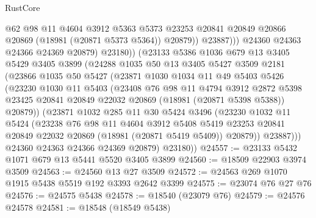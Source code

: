 \begin{lexlean}{RustCore}
\begin{coremodule}
                      @62
                      @98
                      @11
                      @4604
                      @3912
                      @5363
                      @5373
                      @23253
                      @20841
                      @20849
                      @20866
                      @20869
                      (@18981 (@20871 @5373 @5364))
                      @20879))
                  @23887)))
            @24360
            @24363
            @24366
            @24369
            @20879)
          @23180))
      (@23133
        @5386
        @1036
        @679
        @13
        @3405
        @5429
        @3405
        @3899
        (@24288
          @1035
          @50
          @13
          @3405
          @5427
          @3509
          @2181
          (@23866
            @1035
            @50
            @5427
            (@23871
              @1030
              @1034
              @11
              @49
              @5403
              @5426
              (@23230
                @1030
                @11
                @5403
                (@23408
                  @76
                  @98
                  @11
                  @4794
                  @3912
                  @2872
                  @5398
                  @23425
                  @20841
                  @20849
                  @22032
                  @20869
                  (@18981 (@20871 @5398 @5388))
                  @20879))
              (@23871
                @1032
                @285
                @11
                @30
                @5424
                @3496
                (@23230
                  @1032
                  @11
                  @5424
                  (@23238
                    @76
                    @98
                    @11
                    @4604
                    @3912
                    @5408
                    @5419
                    @23253
                    @20841
                    @20849
                    @22032
                    @20869
                    (@18981 (@20871 @5419 @5409))
                    @20879))
                @23887)))
          @24360
          @24363
          @24366
          @24369
          @20879)
        @23180))
@24557 := @23133 @5432 @1071 @679 @13 @5441 @5520 @3405 @3899
@24560 := @18509 @22903 @3974 @3509
@24563 := @24560 @13 @27 @3509
@24572 := @24563 @269 @1070 @1915 @5438 @5519 @192 @3393 @2642 @3399
@24575 := @23074 @76 @27 @76
@24576 := @24575 @5438
@24578 := @18540 (@23079 @76)
@24579 := @24576 @24578
@24581 := @18548 (@18549 @5438)

\end{coremodule}
\end{lexlean}

